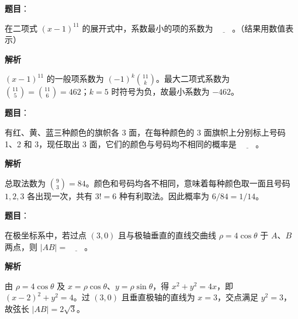 \begin{answer}

\textbf{题目}：

在二项式 $(x-1)^{11}$ 的展开式中，系数最小的项的系数为 $\underline{\qquad}$。（结果用数值表示）

\textbf{解析}

$(x-1)^{11}$ 的一般项系数为 $(-1)^k\binom{11}{k}$。最大二项式系数为 $\binom{11}{5}=\binom{11}{6}=462$；$k=5$ 时符号为负，故最小系数为 $-462$。


\end{answer}
\begin{answer}

\textbf{题目}：

有红、黄、蓝三种颜色的旗帜各 3 面，在每种颜色的 3 面旗帜上分别标上号码 1、2 和 3，现任取出 3 面，它们的颜色与号码均不相同的概率是 $\underline{\qquad}$。

\textbf{解析}

总取法数为 $\binom93=84$。颜色和号码均各不相同，意味着每种颜色取一面且号码 $1,2,3$ 各出现一次，共有 $3!=6$ 种有利取法。因此概率为 $6/84=1/14$。


\end{answer}
\begin{answer}

\textbf{题目}：

在极坐标系中，若过点 $(3,0)$ 且与极轴垂直的直线交曲线 $\rho=4\cos\theta$ 于 $A\text{、}B$ 两点，则 $|AB|=\underline{\qquad}$。

\textbf{解析}

由 $\rho=4\cos\theta$ 及 $x=\rho\cos\theta$、$y=\rho\sin\theta$，得 $x^2+y^2=4x$，即 $(x-2)^2+y^2=4$。过 $(3,0)$ 且垂直极轴的直线为 $x=3$，交点满足 $y^2=3$，故弦长 $|AB|=2\sqrt3$。


\end{answer}
